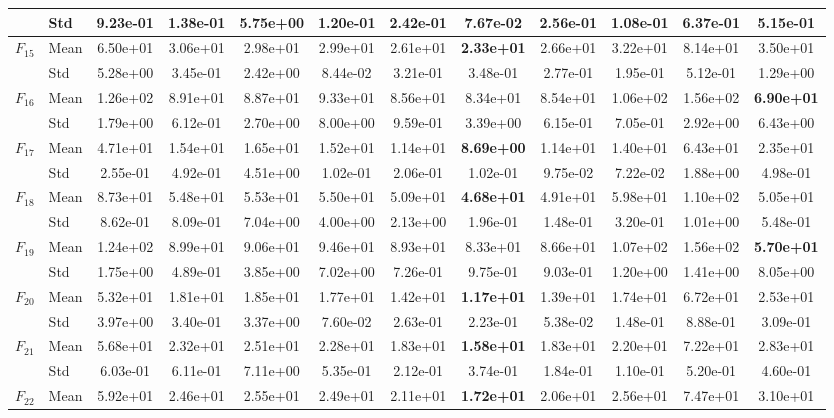 \begin{center}
\begin{longtable}{clcccccccccc}
 & Std & 9.23e-01 & 1.38e-01 & 5.75e+00 & 1.20e-01 & 2.42e-01 & 7.67e-02 & 2.56e-01 & 1.08e-01 & 6.37e-01 & 5.15e-01 \\
\midrule
$F_{15}$ & Mean & 6.50e+01 & 3.06e+01 & 2.98e+01 & 2.99e+01 & 2.61e+01 & \textbf{2.33e+01} & 2.66e+01 & 3.22e+01 & 8.14e+01 & 3.50e+01 \\
 & Std & 5.28e+00 & 3.45e-01 & 2.42e+00 & 8.44e-02 & 3.21e-01 & 3.48e-01 & 2.77e-01 & 1.95e-01 & 5.12e-01 & 1.29e+00 \\
\midrule
$F_{16}$ & Mean & 1.26e+02 & 8.91e+01 & 8.87e+01 & 9.33e+01 & 8.56e+01 & 8.34e+01 & 8.54e+01 & 1.06e+02 & 1.56e+02 & \textbf{6.90e+01} \\
 & Std & 1.79e+00 & 6.12e-01 & 2.70e+00 & 8.00e+00 & 9.59e-01 & 3.39e+00 & 6.15e-01 & 7.05e-01 & 2.92e+00 & 6.43e+00 \\
\midrule
$F_{17}$ & Mean & 4.71e+01 & 1.54e+01 & 1.65e+01 & 1.52e+01 & 1.14e+01 & \textbf{8.69e+00} & 1.14e+01 & 1.40e+01 & 6.43e+01 & 2.35e+01 \\
 & Std & 2.55e-01 & 4.92e-01 & 4.51e+00 & 1.02e-01 & 2.06e-01 & 1.02e-01 & 9.75e-02 & 7.22e-02 & 1.88e+00 & 4.98e-01 \\
\midrule
$F_{18}$ & Mean & 8.73e+01 & 5.48e+01 & 5.53e+01 & 5.50e+01 & 5.09e+01 & \textbf{4.68e+01} & 4.91e+01 & 5.98e+01 & 1.10e+02 & 5.05e+01 \\
 & Std & 8.62e-01 & 8.09e-01 & 7.04e+00 & 4.00e+00 & 2.13e+00 & 1.96e-01 & 1.48e-01 & 3.20e-01 & 1.01e+00 & 5.48e-01 \\
\midrule
$F_{19}$ & Mean & 1.24e+02 & 8.99e+01 & 9.06e+01 & 9.46e+01 & 8.93e+01 & 8.33e+01 & 8.66e+01 & 1.07e+02 & 1.56e+02 & \textbf{5.70e+01} \\
 & Std & 1.75e+00 & 4.89e-01 & 3.85e+00 & 7.02e+00 & 7.26e-01 & 9.75e-01 & 9.03e-01 & 1.20e+00 & 1.41e+00 & 8.05e+00 \\
\midrule
$F_{20}$ & Mean & 5.32e+01 & 1.81e+01 & 1.85e+01 & 1.77e+01 & 1.42e+01 & \textbf{1.17e+01} & 1.39e+01 & 1.74e+01 & 6.72e+01 & 2.53e+01 \\
 & Std & 3.97e+00 & 3.40e-01 & 3.37e+00 & 7.60e-02 & 2.63e-01 & 2.23e-01 & 5.38e-02 & 1.48e-01 & 8.88e-01 & 3.09e-01 \\
\midrule
$F_{21}$ & Mean & 5.68e+01 & 2.32e+01 & 2.51e+01 & 2.28e+01 & 1.83e+01 & \textbf{1.58e+01} & 1.83e+01 & 2.20e+01 & 7.22e+01 & 2.83e+01 \\
 & Std & 6.03e-01 & 6.11e-01 & 7.11e+00 & 5.35e-01 & 2.12e-01 & 3.74e-01 & 1.84e-01 & 1.10e-01 & 5.20e-01 & 4.60e-01 \\
\midrule
$F_{22}$ & Mean & 5.92e+01 & 2.46e+01 & 2.55e+01 & 2.49e+01 & 2.11e+01 & \textbf{1.72e+01} & 2.06e+01 & 2.56e+01 & 7.47e+01 & 3.10e+01 \\

\end{longtable}
\end{center}
